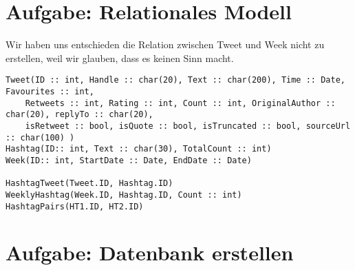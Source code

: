 \section{Aufgabe: Relationales Modell}

Wir haben uns entschieden die Relation zwischen Tweet und Week nicht zu erstellen, weil wir glauben, dass es keinen Sinn macht.

\begin{verbatim}
Tweet(ID :: int, Handle :: char(20), Text :: char(200), Time :: Date, Favourites :: int, 
    Retweets :: int, Rating :: int, Count :: int, OriginalAuthor :: char(20), replyTo :: char(20), 
    isRetweet :: bool, isQuote :: bool, isTruncated :: bool, sourceUrl :: char(100) )
Hashtag(ID:: int, Text :: char(30), TotalCount :: int)
Week(ID:: int, StartDate :: Date, EndDate :: Date)

HashtagTweet(Tweet.ID, Hashtag.ID)
WeeklyHashtag(Week.ID, Hashtag.ID, Count :: int)
HashtagPairs(HT1.ID, HT2.ID)

\end{verbatim}

\section{Aufgabe: Datenbank erstellen}
	

